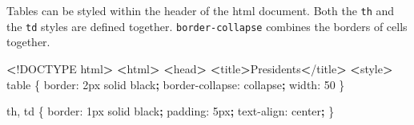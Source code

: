 \documentclass[]{book}
\newenvironment{Shaded}{\begin{snugshade}}{\end{snugshade}}
\newcommand{\ExtensionTok}[1]{#1}
\newcommand{\FunctionTok}[1]{\textcolor[rgb]{0.00,0.00,0.00}{#1}}
\newcommand{\KeywordTok}[1]{\textcolor[rgb]{0.13,0.29,0.53}{\textbf{#1}}}
\newcommand{\NormalTok}[1]{#1}
\newcommand{\OperatorTok}[1]{\textcolor[rgb]{0.81,0.36,0.00}{\textbf{#1}}}
\begin{document}
Tables can be styled within the header of the html document.
Both the \texttt{th} and the \texttt{td} styles are defined together.
\texttt{border-collapse} combines the borders of cells together.

\begin{Shaded}
\begin{Highlighting}[]
\OperatorTok{<}\NormalTok{!}\ExtensionTok{DOCTYPE}\NormalTok{ html}\OperatorTok{>}         
\OperatorTok{<}\ExtensionTok{html}\OperatorTok{>}                  
    \OperatorTok{<}\FunctionTok{head}\OperatorTok{>}                                  
        \OperatorTok{<}\ExtensionTok{title}\OperatorTok{>}\NormalTok{Presidents}\OperatorTok{<}\NormalTok{/title}\OperatorTok{>}           
        \OperatorTok{<}\ExtensionTok{style}\OperatorTok{>}                             
            \ExtensionTok{table}\NormalTok{ \{                         }
                \ExtensionTok{border}\NormalTok{: 2px solid black}\KeywordTok{;}    
                \ExtensionTok{border-collapse}\NormalTok{: collapse}\KeywordTok{;}  
                \ExtensionTok{width}\NormalTok{: 50%}\KeywordTok{;}                 
\NormalTok{            \}                               }
                                            
            \ExtensionTok{th}\NormalTok{, td \{                        }
                \ExtensionTok{border}\NormalTok{: 1px solid black}\KeywordTok{;}    
                \ExtensionTok{padding}\NormalTok{: 5px}\KeywordTok{;}               
                \ExtensionTok{text-align}\NormalTok{: center}\KeywordTok{;}         
\NormalTok{            \}                               }
                                            
}
\end{Highlighting}
\end{Shaded}
\end{document}
